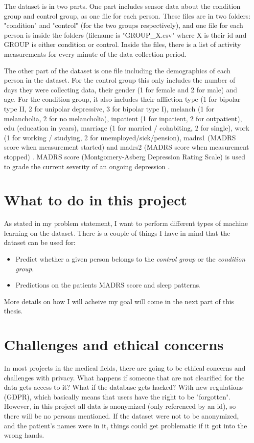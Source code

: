 The dataset is in two parts. One part includes sensor data about the condition group and control group, as one file for each person. 
These files are in two folders: "condition" and "control" (for the two groups respectively), and one file for each person is inside the folders (filename 
is "GROUP\_X.csv" where X is their id and GROUP is either condition or control. Inside the files, there is a list of activity measurements for every 
minute of the data collection period.

The other part of the dataset is one file including the demographics of each person in the dataset. For the control group this only includes the number of 
days they were collecting data, their gender (1 for female and 2 for male) and age. For the condition group, it also includes their affliction type (1 for bipolar
type II, 2 for unipolar depressive, 3 for bipolar type I), melanch (1 for melancholia, 2 for no melancholia), inpatient (1 for inpatient, 2 for outpatient),
edu (education in years), marriage (1 for married / cohabiting, 2 for single), work (1 for working / studying, 2 for unemployed/sick/pension), madrs1 (MADRS score 
when measurement started) and madrs2 (MADRS score when measurement stopped) \cite{dataset_details}. MADRS score (Montgomery-Asberg Depression Rating Scale) 
is used to grade the current severity of an ongoing depression \cite{dataset_details}.

\section{What to do in this project}
As stated in my problem statement, I want to perform different types of machine learning on the dataset. 
There is a couple of things I have in mind that the dataset can be used for:

\begin{itemize}
    \item Predict whether a given person belongs to the \textit{control group} or the \textit{condition group}.
    \item Predictions on the patients MADRS score and sleep patterns.
\end{itemize}

More details on how I will acheive my goal will come in the next part of this thesis.

\section{Challenges and ethical concerns}
In most projects in the medical fields, there are going to be ethical concerns and challenges with privacy. What happens if someone that are not clearified for 
the data gets access to it? What if the database gets hacked? With new regulations (GDPR), which basically means that users have the right to be "forgotten". 
However, in this project all data is anonymized (only referenced by an id), so there will be no persons mentioned. If the dataset were not to be anonymized, 
and the patient's names were in it, things could get problematic if it got into the wrong hands. 



